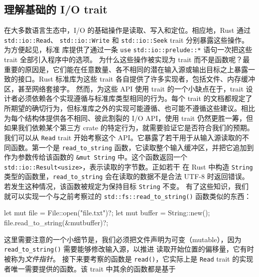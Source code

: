 \subsection{理解基础的 I/\allowbreak{}O trait}
\label{idx:idx_338a187a}
在大多数语言生态中，I/\allowbreak{}O 的基础操作是读取、写入和定位。相应地，Rust 通过 \texttt{std::\allowbreak{}io::\allowbreak{}Read}、
\texttt{std::\allowbreak{}io::\allowbreak{}Write} 和 \texttt{std::\allowbreak{}io::\allowbreak{}Seek} trait 分别暴露这些操作。为方便起见，标准
库提供了通过一条 \texttt{use}
\texttt{std::\allowbreak{}io::\allowbreak{}prelude::\allowbreak{}*} 语句一次把这些 trait 全部引入程序中的选项。
为什么这些操作被实现为 trait 而不是函数呢？最重要的原因是，它们能在任意数量、各不相同的潜在输入源或输出目标之上暴露一致的接口。Rust 标准库为这些 trait 各自提供了许多实现者，包括文件、内存缓冲区，甚至网络套接字。
然而，为这些 API 使用 trait 的一个小缺点在于，trait 设计者必须依赖各个实现遵循与标准库类型相同的行为。每个 trait 的文档都规定了所期望的确切行为，但标准库之外的实现可能遵循、也可能不遵循这些建议。相比为每个结构体提供各不相同、彼此割裂的 I/\allowbreak{}O API，使用 trait 仍然更胜一筹，但如果我们依赖某个第三方 crate 的特定行为，就需要验证它是否符合我们的预期。
\label{idx:idx_db7d33cf}
我们可以从 \texttt{Read} trait 开始考察这个 API。它暴露了若干用于从输入源读取的不同函数。第一个是 \texttt{read\_\allowbreak{}to\_\allowbreak{}string} 函数，它读取整个输入缓冲区，并把它追加到
作为参数传给该函数的 \texttt{\&\allowbreak{}mut String} 中。这个函数返回一个
\texttt{std::\allowbreak{}io::\allowbreak{}Result<\allowbreak{}usize>\allowbreak{}}，表示读取的字节数。正如若干
在 Rust 中构造 \texttt{String} 类型的函数里，\texttt{read\_\allowbreak{}to\_\allowbreak{}string} 会在读取的数据不是合法 UTF-\allowbreak{}8 时返回错误。若发生这种情况，该函数被规定为保持目标
\texttt{String} 不变。
有了这些知识，我们就可以实现一个与之前考察过的
\texttt{std::\allowbreak{}fs::\allowbreak{}read\_\allowbreak{}to\_\allowbreak{}string(\allowbreak{})\allowbreak{}} 函数类似的东西：
\begin{codebox}[rust]
let mut file = File::open("file.txt")?;
let mut buffer = String::new();
file.read_to_string(&mutbuffer)?;
\end{codebox}
这里需要注意的一个小细节是，我们必须把文件声明为可变（mutable），因为
\label{idx:idx_a721266d}
\texttt{read\_\allowbreak{}to\_\allowbreak{}string(\allowbreak{})\allowbreak{}} 需要能够修改输入源，以推进
读取开始位置的偏移量，它有时被称为\emph{文件指针}。
接下来要考察的函数是 \texttt{read()}，它实际上是 \texttt{Read} trait 的实现者唯一需要提供的函数。该 trait 中其余的函数都是基于
